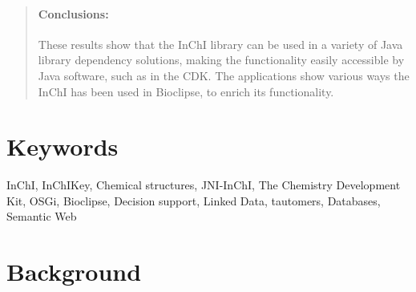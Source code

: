 \documentclass[10pt]{bmc_article}
\newenvironment{bmcformat}{\fussy\setboolean{publ}{true}}{\fussy}
\begin{document}
\begin{bmcformat}
\begin{abstract}
\paragraph*{Conclusions:}
These results show that the InChI library can be used in a variety of Java library dependency solutions, making
the functionality easily accessible by Java software, such as in the CDK. The applications show various ways the InChI
has been used in Bioclipse, to enrich its functionality.
        
\end{abstract}









\section*{Keywords}
InChI, InChIKey, Chemical structures, JNI-InChI, The Chemistry Development Kit, OSGi, Bioclipse, Decision support, Linked Data, tautomers, Databases, Semantic Web


\section*{Background}


\end{bmcformat}
\end{document}
